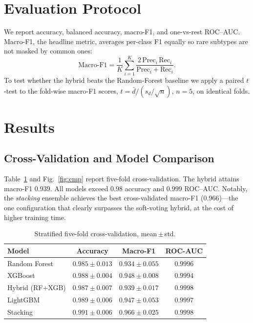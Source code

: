 \documentclass[conference]{IEEEtran}
\begin{document}
\section{Evaluation Protocol}
We report accuracy, balanced accuracy, macro-F1, and one-vs-rest ROC--AUC.
Macro-F1, the headline metric, averages per-class F1 equally so rare subtypes are
not masked by common ones:
\begin{equation}
\mathrm{Macro\text{-}F1}=\frac{1}{K}\sum_{i=1}^{K}
\frac{2\,\mathrm{Prec}_i\,\mathrm{Rec}_i}{\mathrm{Prec}_i+\mathrm{Rec}_i}.
\end{equation}
To test whether the hybrid beats the Random-Forest baseline we apply a paired
$t$-test to the fold-wise macro-F1 scores, $t=\bar{d}/(s_d/\sqrt{n})$, $n{=}5$, on
identical folds.

\section{Results}
\subsection{Cross-Validation and Model Comparison}
Table~\ref{tab:cv} and Fig.~\ref{fig:cmp} report five-fold cross-validation. The
hybrid attains macro-F1 $0.939$. All models exceed $0.98$ accuracy and $0.999$
ROC--AUC. Notably, the \emph{stacking} ensemble achieves the best cross-validated
macro-F1 ($0.966$)---the one configuration that clearly surpasses the soft-voting
hybrid, at the cost of higher training time.

\begin{table}[t]
\caption{Stratified five-fold cross-validation, mean\,$\pm$\,std.}
\label{tab:cv}
\centering
\renewcommand{\arraystretch}{1.2}
\begin{tabular}{lccc}
\toprule
\textbf{Model} & \textbf{Accuracy} & \textbf{Macro-F1} & \textbf{ROC-AUC} \\
\midrule
Random Forest     & $0.985\pm0.013$ & $0.934\pm0.055$ & $0.9996$ \\
XGBoost           & $0.988\pm0.004$ & $0.948\pm0.008$ & $0.9994$ \\
Hybrid (RF$+$XGB) & $0.987\pm0.007$ & $0.939\pm0.017$ & $0.9998$ \\
LightGBM          & $0.989\pm0.006$ & $0.947\pm0.053$ & $0.9997$ \\
Stacking          & $\mathbf{0.991\pm0.006}$ & $\mathbf{0.966\pm0.025}$ & $0.9998$ \\
\bottomrule
\end{tabular}
\end{table}
\end{document}
